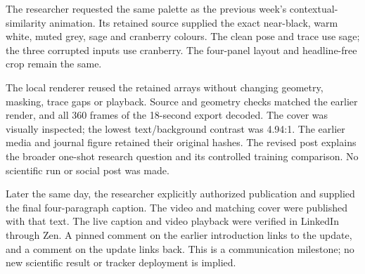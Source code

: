 
The researcher requested the same palette as the previous week's
contextual-similarity animation. Its retained source supplied the exact
near-black, warm white, muted grey, sage and cranberry colours. The clean
pose and trace use sage; the three corrupted inputs use cranberry.
The four-panel layout and headline-free crop remain the same.

The local renderer reused the retained arrays without changing geometry,
masking, trace gaps or playback. Source and geometry checks matched the
earlier render, and all 360 frames of the 18-second export decoded.
The cover was visually inspected; the lowest text/background contrast was
4.94:1. The earlier media and journal figure retained their original hashes.
The revised post explains the broader one-shot research question and its
controlled training comparison. No scientific run or social post was made.

Later the same day, the researcher explicitly authorized publication and
supplied the final four-paragraph caption. The video and matching cover were
published with that text. The live caption and video playback were verified
in LinkedIn through Zen. A pinned comment on the earlier introduction links
to the update, and a comment on the update links back. This is a communication
milestone; no new scientific result or tracker deployment is implied.


